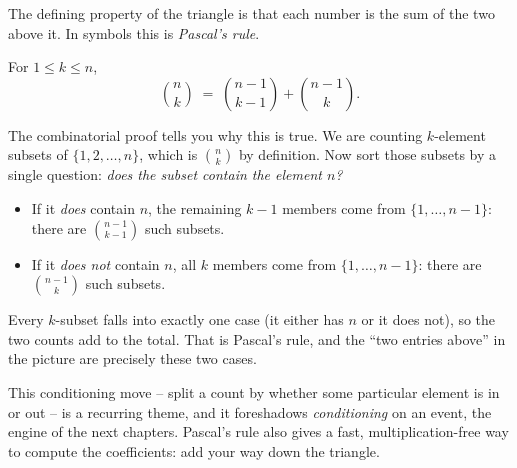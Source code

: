 The defining property of the triangle is that each number is the sum of the two above it.
In symbols this is \emph{Pascal's rule}.

\begin{theorem}
\label{ch2:thm-pascal}
For $1 \le k \le n$,
\[
  \binom{n}{k} \;=\; \binom{n-1}{k-1} + \binom{n-1}{k}.
\]
\end{theorem}

\begin{whybox}
The combinatorial proof tells you why this is true. We are counting
$k$-element subsets of $\{1,2,\dots,n\}$, which is $\binom{n}{k}$ by definition. Now sort
those subsets by a single question: \emph{does the subset contain the element $n$?}
\begin{itemize}
  \item If it \emph{does} contain $n$, the remaining $k-1$ members come from $\{1,\dots,n-1\}$:
        there are $\binom{n-1}{k-1}$ such subsets.
  \item If it \emph{does not} contain $n$, all $k$ members come from $\{1,\dots,n-1\}$:
        there are $\binom{n-1}{k}$ such subsets.
\end{itemize}
Every $k$-subset falls into exactly one case (it either has $n$ or it does not), so the two
counts add to the total. That is Pascal's rule, and the ``two entries above'' in the
picture are precisely these two cases.
\end{whybox}

This conditioning move -- split a count by whether some particular element is in or out -- is
a recurring theme, and it foreshadows \emph{conditioning} on an event, the engine of the
next chapters. Pascal's rule also gives a fast, multiplication-free way to compute the
coefficients: add your way down the triangle.

